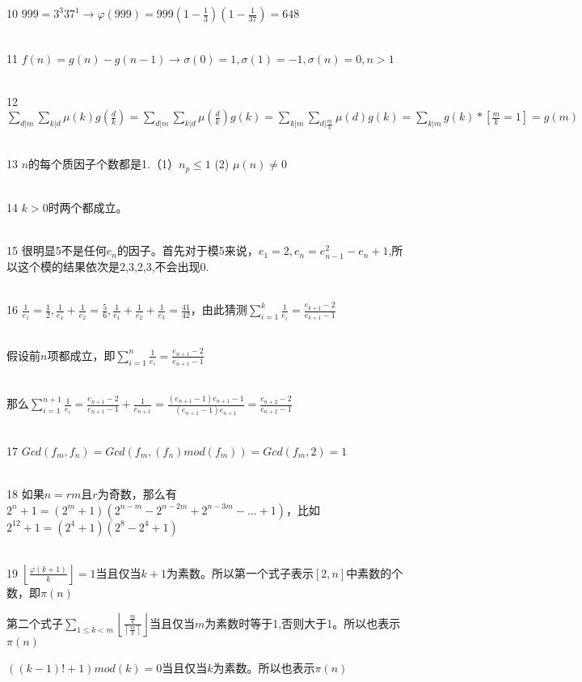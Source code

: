 \documentclass[onecolumn]{article}
\begin{document}
10 $999=3^{3}37^{1}\rightarrow \varphi (999)=999(1-\frac{1}{3})(1-\frac{1}{37})=648$\par
~\\
11 $f(n)=g(n)-g(n-1)\rightarrow \sigma (0)=1,\sigma (1)=-1,\sigma (n)=0,n>1$\par
~\\
12 $\sum_{d|m}\sum _{k|d}\mu (k)g(\frac{d}{k})=\sum_{d|m}\sum _{k|d}\mu  (\frac{d}{k})g(k)=\sum_{k|m}\sum _{d|\frac{m}{k}}\mu (d)g(k)=\sum_{k|m}g(k)*[\frac{m}{k}=1]=g(m)$\par
~\\
13 $n$的每个质因子个数都是1.（1）$n_{p}\leq 1$ (2) $\mu (n)\neq 0$ \par
~\\
14 $k>0$时两个都成立。\par
~\\
15 很明显5不是任何$e_{n}$的因子。首先对于模5来说，$e_{1}=2,e_{n}=e_{n-1}^{2}-e_{n}+1$,所以这个模的结果依次是2,3,2,3,不会出现0.\par
~\\
16 $\frac{1}{e_{1}}=\frac{1}{2},\frac{1}{e_{1}}+\frac{1}{e_{2}}=\frac{5}{6},\frac{1}{e_{1}}+\frac{1}{e_{2}}+\frac{1}{e_{3}}=\frac{41}{42}$，由此猜测$\sum_{i=1}^{k}\frac{1}{e_{i}}=\frac{e_{k+1}-2}{e_{k+1}-1}$\par
~\\
假设前$n$项都成立，即$\sum_{i=1}^{n}\frac{1}{e_{i}}=\frac{e_{n+1}-2}{e_{n+1}-1}$ \par
~\\
那么$\sum_{i=1}^{n+1}\frac{1}{e_{i}}=\frac{e_{n+1}-2}{e_{n+1}-1}+\frac{1}{e_{n+1}}=\frac{(e_{n+1}-1)e_{n+1}-1}{(e_{n+1}-1)e_{n+1}}=\frac{e_{n+2}-2}{e_{n+2}-1}$ \par
~\\
17 $Gcd(f_{m},f_{n})=Gcd(f_{m},(f_{n})mod(f_{m}))=Gcd(f_{m},2)=1$ \par
~\\
18 如果$n=rm$且$r$为奇数，那么有$2^{n}+1=(2^{m}+1)(2^{n-m}-2^{n-2m}+2^{n-3m}-...+1)$，比如$2^{12}+1=(2^{4}+1)(2^{8}-2^{4}+1)$ \par
~\\
19 $\left \lfloor \frac{\varphi (k+1)}{k} \right \rfloor=1$当且仅当$k+1$为素数。所以第一个式子表示$[2,n]$中素数的个数，即$\pi (n)$ \par
第二个式子$\sum_{1\leq k<m}\left \lfloor \frac{\frac{m}{k}}{\left \lceil \frac{m}{k} \right \rceil} \right \rfloor$当且仅当$m$为素数时等于1,否则大于1。所以也表示$\pi (n)$ \par
$((k-1)!+1)mod(k)=0$当且仅当$k$为素数。所以也表示$\pi (n)$ \par
\end{document}

